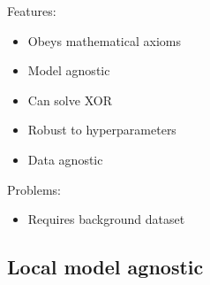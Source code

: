 Features:
\begin{itemize}
    \item Obeys mathematical axioms
    \item Model agnostic
    \item Can solve XOR 
    \item Robust to hyperparameters
    \item Data agnostic
\end{itemize}
Problems:
\begin{itemize}
    \item Requires background dataset
\end{itemize}

\subsection{Local model agnostic}